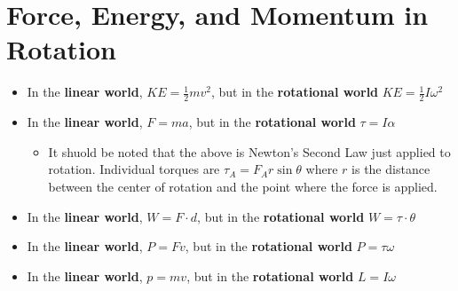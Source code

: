 \section{Force, Energy, and Momentum in Rotation}

\begin{itemize}
    \item In the \textbf{linear world}, $KE = \frac{1}{2}mv^2$, but in the \textbf{rotational world} $KE = \frac{1}{2}I\omega^2$
    \item  In the \textbf{linear world}, $F = ma$, but in the \textbf{rotational world} $\tau = I\alpha$
    \begin{itemize}
        \item It shuold be noted that the above is Newton's Second Law just applied to rotation. Individual torques are $\tau_A = F_Ar\sin\theta$ where $r$ is the distance between the center of rotation and the point where the force is applied.
    \end{itemize}
    \item In the \textbf{linear world}, $W = F \cdot d$, but in the \textbf{rotational world} $W = \tau \cdot \theta$
    \item In the \textbf{linear world}, $P = Fv$, but in the \textbf{rotational world} $P = \tau\omega$
    \item In the \textbf{linear world}, $p = mv$, but in the \textbf{rotational world} $L = I\omega$
\end{itemize}